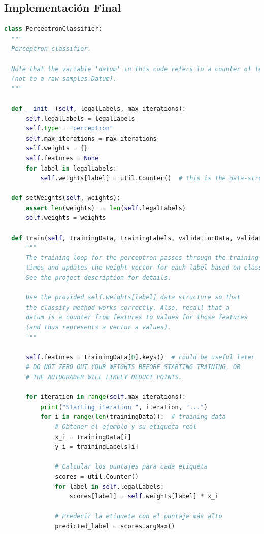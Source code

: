 \documentclass{report}
\begin{document}
      \subsection*{Implementación Final}
        \begin{lstlisting}[language=Python, caption=Implementación final del perceptron]
class PerceptronClassifier:
  """
  Perceptron classifier.

  Note that the variable 'datum' in this code refers to a counter of features
  (not to a raw samples.Datum).
  """

  def __init__(self, legalLabels, max_iterations):
      self.legalLabels = legalLabels
      self.type = "perceptron"
      self.max_iterations = max_iterations
      self.weights = {}
      self.features = None
      for label in legalLabels:
          self.weights[label] = util.Counter()  # this is the data-structure you should use

  def setWeights(self, weights):
      assert len(weights) == len(self.legalLabels)
      self.weights = weights

  def train(self, trainingData, trainingLabels, validationData, validationLabels):
      """
      The training loop for the perceptron passes through the training data several
      times and updates the weight vector for each label based on classification errors.
      See the project description for details.

      Use the provided self.weights[label] data structure so that
      the classify method works correctly. Also, recall that a
      datum is a counter from features to values for those features
      (and thus represents a vector a values).
      """

      self.features = trainingData[0].keys()  # could be useful later
      # DO NOT ZERO OUT YOUR WEIGHTS BEFORE STARTING TRAINING, OR
      # THE AUTOGRADER WILL LIKELY DEDUCT POINTS.

      for iteration in range(self.max_iterations):
          print("Starting iteration ", iteration, "...")
          for i in range(len(trainingData)):  # training data
              # Obtener el ejemplo y su etiqueta real
              x_i = trainingData[i]
              y_i = trainingLabels[i]

              # Calcular los puntajes para cada etiqueta
              scores = util.Counter()
              for label in self.legalLabels:
                  scores[label] = self.weights[label] * x_i

              # Predecir la etiqueta con el puntaje más alto
              predicted_label = scores.argMax()


\end{lstlisting}
\end{document}
